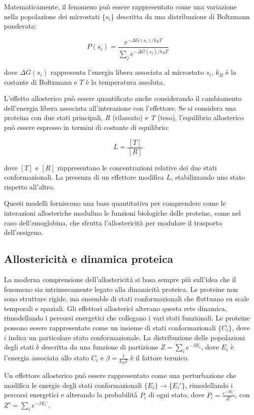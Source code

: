 \documentclass[Lau,binding=0.6cm,oneside,noexaminfo]{sapthesis}
\begin{document}
Matematicamente, il fenomeno può essere rappresentato come una variazione nella popolazione dei microstati $\{s_i\}$ descritta da una distribuzione di Boltzmann ponderata:

\[
P(s_i) = \frac{e^{-\Delta G(s_i)/k_B T}}{\sum_{j} e^{-\Delta G(s_j)/k_B T}}
\]

dove $\Delta G(s_i)$ rappresenta l'energia libera associata al microstato $s_i$, $k_B$ è la costante di Boltzmann e $T$ è la temperatura assoluta.

L’effetto allosterico può essere quantificato anche considerando il cambiamento dell’energia libera associata all’interazione con l’effettore. Se si considera una proteina con due stati principali, \emph{R} (rilassato) e \emph{T} (teso), l’equilibrio allosterico può essere espresso in termini di costante di equilibrio:

\[
L = \frac{[T]}{[R]}
\]

dove $[T]$ e $[R]$ rappresentano le concentrazioni relative dei due stati conformazionali. La presenza di un effettore modifica $L$, stabilizzando uno stato rispetto all’altro.

Questi modelli forniscono una base quantitativa per comprendere come le interazioni allosteriche modulino le funzioni biologiche delle proteine, come nel caso dell’emoglobina, che sfrutta l’allostericità per modulare il trasporto dell’ossigeno.

\subsection*{Allostericità e dinamica proteica}
La moderna comprensione dell’allostericità si basa sempre più sull’idea che il fenomeno sia intrinsecamente legato alla dinamicità proteica. Le proteine non sono strutture rigide, ma ensemble di stati conformazionali che fluttuano su scale temporali e spaziali. Gli effettori allosterici alterano questa rete dinamica, rimodellando i percorsi energetici che collegano i vari stati funzionali.
Le proteine possono essere rappresentate come un insieme di stati conformazionali $\{C_i\}$, dove $i$ indica un particolare stato conformazionale. La distribuzione delle popolazioni degli stati è descritta da una funzione di partizione $Z = \sum_{i} e^{-\beta E_i}$, dove $E_i$ è l'energia associata allo stato $C_i$ e $\beta = \frac{1}{k_B T}$ è il fattore termico.

Un effettore allosterico può essere rappresentato come una perturbazione che modifica le energie degli stati conformazionali $\{E_i\} \to \{E_i'\}$, rimodellando i percorsi energetici e alterando la probabilità $P_i$ di ogni stato, dove $P_i = \frac{e^{-\beta E_i'}}{Z'}$, con $Z' = \sum_{i} e^{-\beta E_i'}$.
\end{document}
